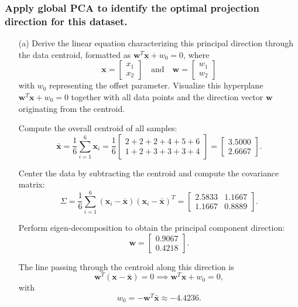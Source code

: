 \documentclass[11pt,addpoints,answers]{exam}
\begin{document}
\begin{enumerate}
		\subsubsection*{Apply global PCA to identify the optimal projection direction for this dataset.}
		\begin{enumerate}
			\item[(a)] Derive the linear equation characterizing this principal direction through the data centroid, formatted as $\mathbf{w}^{T} \mathbf{x} + w_{0} = 0$, where 
			\[
			\mathbf{x} = \begin{bmatrix} x_{1} \\ x_{2} \end{bmatrix} \quad \text{and} \quad \mathbf{w} = \begin{bmatrix} w_{1} \\ w_{2} \end{bmatrix}
			\]
			with $w_{0}$ representing the offset parameter. Visualize this hyperplane $\mathbf{w}^{T} \mathbf{x} + w_{0} = 0$ together with all data points and the direction vector $\mathbf{w}$ originating from the centroid.
			\begin{your_solution}[title=Principal Component Equation, height=12cm]
				Compute the overall centroid of all samples:
				\[
				\bar{\mathbf{x}} = \frac{1}{6}\sum_{i=1}^{6} \mathbf{x}_i = \frac{1}{6} 
				\begin{bmatrix} 2+2+2+4+5+6 \\ 1+2+3+3+3+4 \end{bmatrix} = \begin{bmatrix} 3.5000 \\ 2.6667 \end{bmatrix}.
				\]

					Center the data by subtracting the centroid and compute the covariance matrix:
					\[
					\Sigma = \frac{1}{6} \sum_{i=1}^{6} (\mathbf{x}_i - \bar{\mathbf{x}})(\mathbf{x}_i - \bar{\mathbf{x}})^T
					= \begin{bmatrix} 2.5833 & 1.1667 \\ 1.1667 & 0.8889 \end{bmatrix}.
					\]

					Perform eigen-decomposition to obtain the principal component direction:
					\[
					\mathbf{w} = \begin{bmatrix} 0.9067 \\ 0.4218 \end{bmatrix}.
					\]

					The line passing through the centroid along this direction is
					\[
					\mathbf{w}^T (\mathbf{x} - \bar{\mathbf{x}}) = 0 \implies \mathbf{w}^T \mathbf{x} + w_0 = 0,
					\]
					with
				\[
				w_0 = - \mathbf{w}^T \bar{\mathbf{x}} \approx -4.4236.
				\]


\end{your_solution}
\end{enumerate}
\end{enumerate}
\end{document}
